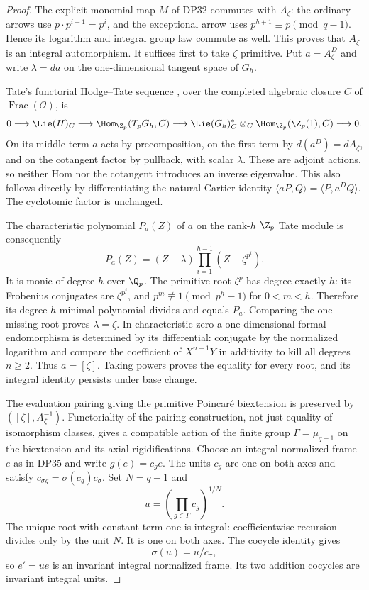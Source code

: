 \begin{proof}
The explicit monomial map $M$ of DP32 commutes with $A_\zeta$: the ordinary arrows use $p\cdot p^{i-1}=p^i$, and the exceptional arrow uses $p^{h+1}\equiv p\pmod{q-1}$. Hence its logarithm and integral group law commute as well. This proves that $A_\zeta$ is an integral automorphism. It suffices first to take $\zeta$ primitive. Put $a=A_\zeta^D$ and write $\lambda=da$ on the one-dimensional tangent space of $G_h$.

Tate's functorial Hodge--Tate sequence \cite[\S4, Corollary 2 following Theorem 3, p.~180]{Tate67}, over the completed algebraic closure $C$ of $\operatorname{Frac}(\mathcal O)$, is
\[
 0\longrightarrow \Lie(H)_C
 \longrightarrow \Hom_{\Z_p}(T_pG_h,C)
 \longrightarrow \Lie(G_h)_C^*\otimes_C\Hom_{\Z_p}(\Z_p(1),C)
 \longrightarrow0.
\]
On its middle term $a$ acts by precomposition, on the first term by $d(a^D)=dA_\zeta$, and on the cotangent factor by pullback, with scalar $\lambda$. These are adjoint actions, so neither Hom nor the cotangent introduces an inverse eigenvalue. This also follows directly by differentiating the natural Cartier identity $\langle aP,Q\rangle=\langle P,a^DQ\rangle$. The cyclotomic factor is unchanged.

The characteristic polynomial $P_a(Z)$ of $a$ on the rank-$h$ $\Z_p$ Tate module is consequently
\[
 P_a(Z)=(Z-\lambda)\prod_{i=1}^{h-1}(Z-\zeta^{p^i}).
\]
It is monic of degree $h$ over $\Q_p$. The primitive root $\zeta^p$ has degree exactly $h$: its Frobenius conjugates are $\zeta^{p^j}$, and $p^m\not\equiv1\pmod{p^h-1}$ for $0<m<h$. Therefore its degree-$h$ minimal polynomial divides and equals $P_a$. Comparing the one missing root proves $\lambda=\zeta$. In characteristic zero a one-dimensional formal endomorphism is determined by its differential: conjugate by the normalized logarithm and compare the coefficient of $X^{n-1}Y$ in additivity to kill all degrees $n\ge2$. Thus $a=[\zeta]$. Taking powers proves the equality for every root, and its integral identity persists under base change.

The evaluation pairing giving the primitive Poincar\'e biextension is preserved by $([\zeta],A_\zeta^{-1})$. Functoriality of the pairing construction, not just equality of isomorphism classes, gives a compatible action of the finite group $\Gamma=\mu_{q-1}$ on the biextension and its axial rigidifications. Choose an integral normalized frame $e$ as in DP35 and write $g(e)=c_g e$. The units $c_g$ are one on both axes and satisfy $c_{\sigma g}=\sigma(c_g)c_\sigma$. Set $N=q-1$ and
\[
 u=\left(\prod_{g\in\Gamma}c_g\right)^{1/N}.
\]
The unique root with constant term one is integral: coefficientwise recursion divides only by the unit $N$. It is one on both axes. The cocycle identity gives
\[
 \sigma(u)=u/c_\sigma,
\]
so $e'=ue$ is an invariant integral normalized frame. Its two addition cocycles are invariant integral units.


\end{proof}

